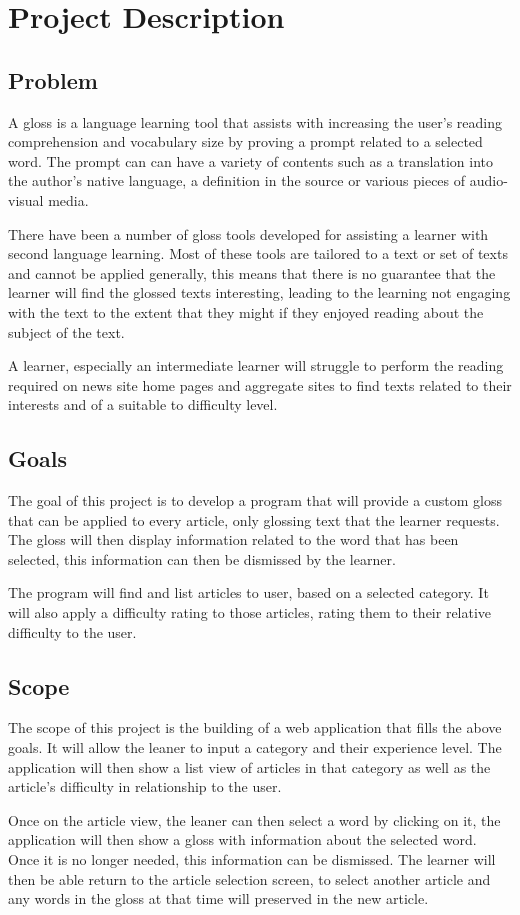 \chapter{Project Description}
\section{Problem}
A gloss is a language learning tool that assists with increasing the user's reading comprehension and vocabulary size by proving a prompt related to a selected word. The prompt can  can have a variety of contents such as a translation into the author's native language, a definition in the source or various pieces of audio-visual media.

There have been a number of gloss tools developed for assisting a learner with second language learning. Most of these tools are tailored to a text or set of texts and cannot be applied generally, this means that there is no guarantee that the learner will find the glossed texts interesting, leading to the learning not engaging with the text to the extent that they might if they enjoyed reading about the subject of the text. 

A learner, especially an intermediate learner will struggle to perform the reading required on news site home pages and aggregate sites to find texts related to their interests and of a suitable to difficulty level.

\section{Goals}

The goal of this project is to develop a program that will provide a custom gloss that can be applied to every article, only glossing text that the learner requests. The gloss will then display information related to the word that has been selected, this information can then be dismissed by the learner.

The program will find and list articles to user, based on a selected category. It will also apply a difficulty rating to those articles, rating them to their relative difficulty to the user.

\section{Scope}

The scope of this project is the building of a web application that fills the above goals. It will allow the leaner to input a category and their experience level. The application will then show a list view of articles in that category as well as the article's difficulty in relationship to the user.

Once on the article view, the leaner can then select a word by clicking on it, the application will then show a gloss with information about the selected word. Once it is no longer needed, this information can be dismissed. The learner will then be able return to the  article selection screen, to select another article and any words in the gloss at that time will preserved in the new article. 